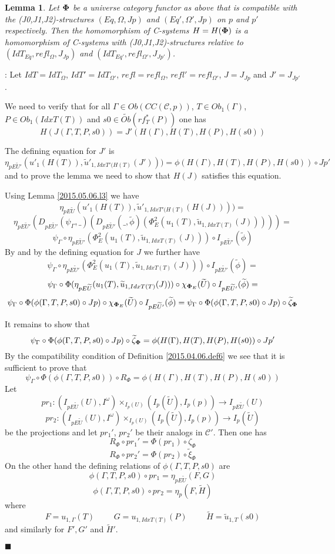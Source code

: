 \documentclass[12pt]{article}
\numberwithin{equation}{section}
\newenvironment{myproof}{{\bf Proof}:}{$\blacksquare$ \vskip 5mm }
\newtheorem{lemma}[proposition]{Lemma}
\newcommand{\llabel}[1]{\label{#1}}
\newcommand{\sr}{\rightarrow}
\newcommand{\wt}{\widetilde}
\newcommand{\spc}{{\,\,\,\,\,\,\,}}
\newcommand{\toCC}{CC} %
\begin{document}
\begin{lemma}
\llabel{2015.04.12.l3} Let ${\bf\Phi}$ be a universe category functor as above
that is compatible with the (J0,J1,J2)-structures $(Eq,\Omega,Jp)$ and
$(Eq',\Omega',Jp)$ on $p$ and $p'$ respectively. Then the homomorphism of
C-systems $H=H({\bf\Phi})$ is a homomorphism of C-systems with
(J0,J1,J2)-structures relative to $(IdT_{Eq},refl_{\Omega},J_{Jp})$ and
$(IdT_{Eq'},refl_{\Omega'},J_{Jp'})$.
\end{lemma}
%
\begin{myproof}
Let $IdT=IdT_{\Omega}$, $IdT'=IdT_{\Omega'}$, $refl=refl_{\Omega}$,
$refl'=refl_{\Omega'}$, $J=J_{Jp}$ and $J'=J_{Jp'}$.

We need to verify that for all $\Gamma\in Ob(\toCC({\mathcal C},p))$, $T\in
Ob_1(\Gamma)$, $P\in Ob_1(IdxT(T))$ and $s0\in \wt{Ob}(rf^*_T(P))$ one has
%
$$H(J(\Gamma,T,P,s0))=J'(H(\Gamma),H(T),H(P),H(s0))$$
%

The defining equation for $J'$ is
%
$$\eta_{pE\wt{U}'}(u'_1(H(T)),\wt{u}'_{1,{IdxT'(H(T)}}(J')))=\phi(H(\Gamma),H(T),H(P),H(s0))\circ
Jp'$$
%
and to prove the lemma we need to show that $H(J)$ satisfies this equation.

Using Lemma \ref{2015.05.06.l3} we have
%
$$\eta_{pE\wt{U}}(u'_1(H(T)),\wt{u}'_{1,{IdxT'(H(T)}}(H(J))))=$$$$\eta_{pE\wt{U}'}(D_{pE\wt{U}'}(\psi_{\Gamma},\_)(D_{pE\wt{U}'}(\_,\wt{\phi})(\Phi_E^2(u_1(T),\wt{u}_{1,IdxT(T)}(J)))))=$$
$$\psi_{\Gamma}\circ
\eta_{pE\wt{U}'}(\Phi_E^2(u_1(T),\wt{u}_{1,IdxT(T)}(J)))\circ
I_{pE\wt{U}'}(\wt{\phi})$$
%
By \cite[Lemma 5.8]{fromunivwithPi} and by the defining equation for $J$ we
further have
%
$$\psi_{\Gamma}\circ
\eta_{pE\wt{U}'}(\Phi_E^2(u_1(T),\wt{u}_{1,IdxT(T)}(J)))\circ
I_{pE\wt{U}'}(\wt{\phi})=$$$$\psi_{\Gamma}\circ
\Phi(\eta_{pE\wt{U}}(u_1(T),\wt{u}_{1,IdxT(T)}(J)))\circ
\chi_{{\bf\Phi}_E}(\wt{U})\circ I_{pE\wt{U}'}(\wt{\phi})=$$
$$\psi_{\Gamma}\circ \Phi(\phi(\Gamma,T,P,s0)\circ Jp)\circ
\chi_{{\bf\Phi}_E}(\wt{U})\circ I_{pE\wt{U}'}(\wt{\phi})=\psi_{\Gamma}\circ
\Phi(\phi(\Gamma,T,P,s0)\circ Jp)\circ \wt{\zeta}_{\bf\Phi}$$
%

It remains to show that
%
$$\psi_{\Gamma}\circ \Phi(\phi(\Gamma,T,P,s0)\circ Jp)\circ
\wt{\zeta}_{\bf\Phi}=\phi(H(\Gamma),H(T),H(P),H(s0))\circ Jp'$$
%
By the compatibility condition of Definition \ref{2015.04.06.def6} we see that
it is sufficient to prove that
%
$$\psi_{\Gamma}\circ \Phi(\phi(\Gamma,T,P,s0))\circ R_{\Phi} =
\phi(H(\Gamma),H(T),H(P),H(s0))$$
%
Let
%
$$pr_1:(I_{pE\wt{U}}(U),I^{\omega})\times_{I_{p}(U)}(I_{p}(\wt{U}),I_p(p))\sr
I_{pE\wt{U}}(U)$$
$$pr_2:(I_{pE\wt{U}}(U),I^{\omega})\times_{I_{p}(U)}(I_{p}(\wt{U}),I_p(p))\sr
I_{p}(\wt{U})$$
%
be the projections and let $pr_1'$, $pr_2'$ be their analogs in $\mathcal
C'$. Then one has
%
$$R_{\Phi}\circ pr_1'=\Phi(pr_1)\circ \zeta_{\Phi}$$
$$R_{\Phi}\circ pr_2'=\Phi(pr_2)\circ \wt{\xi}_{\Phi}$$
%
On the other hand the defining relations of $\phi(\Gamma,T,P,s0)$ are
%
$$\phi(\Gamma,T,P,s0)\circ pr_1=\eta_{pE\wt{U}}(F,G)$$
$$\phi(\Gamma,T,P,s0)\circ pr_2=\eta_p(F,\wt{H})$$
%
where
%
$$F=u_{1,\Gamma}(T)\spc\spc G=u_{1,IdxT(T)}(P)\spc\spc
\wt{H}=\wt{u}_{1,T}(s0)$$
%
and similarly for $F',G'$ and $\wt{H}'$.


\end{myproof}
\end{document}
